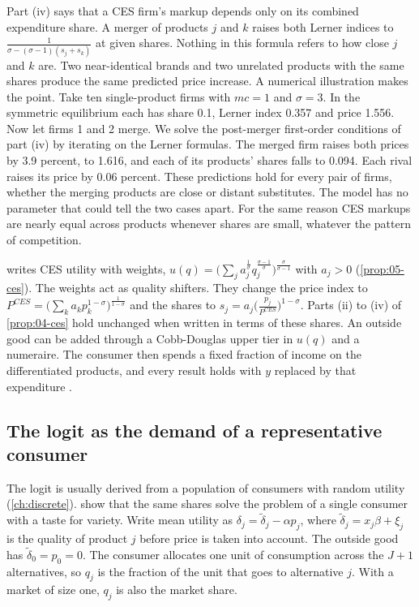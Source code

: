  Part (iv) says that a CES firm's markup depends only on its combined
expenditure share. A merger of products $j$ and $k$ raises both Lerner indices to
$\frac{1}{\sigma - (\sigma - 1)(s_j + s_k)}$ at given shares. Nothing in this formula refers to how close $j$ and $k$
are. Two near-identical brands and two unrelated products with the same shares produce the same predicted price
increase. A numerical illustration makes the point. Take ten single-product firms with $mc = 1$ and $\sigma = 3$.
In the symmetric equilibrium each has share 0.1, Lerner index 0.357 and price 1.556. Now let firms 1 and 2 merge.
We solve the post-merger first-order conditions of part (iv) by iterating on the Lerner formulas. The merged
firm raises both prices by 3.9 percent, to 1.616, and each of its products' shares falls to 0.094. Each rival raises
its price by 0.06 percent. These predictions hold for every pair of firms, whether the merging products are close or
distant substitutes. The model has no parameter that could tell the two cases apart. For the same reason CES
markups are nearly equal across products whenever shares are small, whatever the pattern of competition.

\begin{remark}\label{rem:04-ces-weights}
 writes CES utility with weights,
$u(q) = \big(\sum_j a_j^{\frac{1}{\sigma}}q_j^{\frac{\sigma-1}{\sigma}}\big)^{\frac{\sigma}{\sigma-1}}$ with $a_j > 0$
(\cref{prop:05-ces}). The weights act as quality shifters. They change the price index to
$P^{CES} = \big(\sum_k a_kp_k^{1-\sigma}\big)^{\frac{1}{1-\sigma}}$ and the shares to
$s_j = a_j\big(\frac{p_j}{P^{CES}}\big)^{1-\sigma}$. Parts (ii) to (iv) of \cref{prop:04-ces} hold unchanged when
written in terms of these shares. An outside good can be added through a Cobb-Douglas upper tier in $u(q)$ and a
numeraire. The consumer then spends a fixed fraction of income on the differentiated products, and every result
holds with $y$ replaced by that expenditure \citep[Section 8]{CaplinNalebuff1991}.
\end{remark}

\subsection{The logit as the demand of a representative consumer}\label{sec:04-repcons-logit}

The logit is usually derived from a population of consumers with random utility (\cref{ch:discrete}).
\citet{AndersonDePalmaThisse1988} show that the same shares solve the problem of a single consumer with a taste for
variety. Write mean utility as $\delta_j = \tilde\delta_j - \alpha p_j$, where $\tilde\delta_j = x_j\beta + \xi_j$ is
the quality of product $j$ before price is taken into account. The outside good has $\tilde\delta_0 = p_0 = 0$. The
consumer allocates one unit of consumption across the $J + 1$ alternatives, so $q_j$ is the fraction of the unit
that goes to alternative $j$. With a market of size one, $q_j$ is also the market share.

